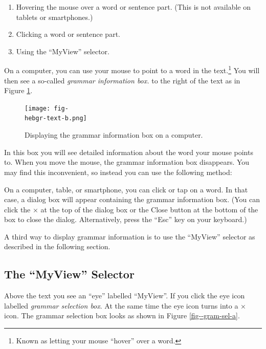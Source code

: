 \documentclass[11pt,oneside,a4paper]{memoir}
\newcommand{\hebgr}{}   %
\newcommand{\hebgrlong}{}   %
\begin{document}
{\begin{enumerate}
  \item Hovering the mouse over a word or sentence part. (This is not available on tablets or
    smartphones.)
  \item Clicking a word or sentence part.
  \item Using the ``MyView'' selector.
\end{enumerate}

On a computer, you can use your mouse to point to a word in the text.\footnote{Known as letting your
  mouse ``hover'' over a word.} You will then see a so-called \emph{grammar information
  box.}
to the right of the text as in Figure \ref{fig-\hebgr-text-b}.
\begin{figure}
  \begin{center}
    \texttt{[image: fig-\\hebgr-text-b.png]}
  \end{center}
  \caption{Displaying the grammar information box on a computer.}\label{fig-\hebgr-text-b}
\end{figure}
In this box you will see detailed information about the word your mouse points to. When you move the
mouse, the grammar information box disappears. You may find this inconvenient, so instead you can
use the following method:

On a computer, table, or smartphone, you can click or tap on a word. In that case, a dialog box will
appear containing the grammar information box. (You can click the × at the top of the dialog box or
the Close button at the bottom of the box to close the dialog. Alternatively, press the ``Esc'' key
on your keyboard.)

A third way to display grammar information is to use the ``MyView'' selector as described in the
following section.

\subsection{The ``MyView'' Selector}\label{sec-\hebgr-myview-selector}

Above the \hebgrlong{} text you see an ``eye'' labelled ``MyView''. If you click the eye icon labelled
\emph{grammar selection box}. At the same time the eye icon turns into
a × icon. The grammar selection box looks as shown in Figure \ref{fig-\hebgr-gram-sel-a}.

}
\end{document}
